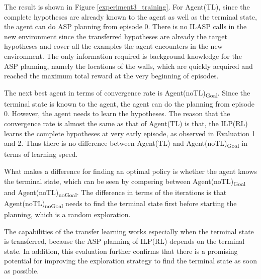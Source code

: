 The result is shown in Figure \ref{experiment3_training}.
For Agent(TL), since the complete hypotheses are already known to the agent as well as the terminal state, the agent can do ASP planning from episode 0. There is no ILASP calls in the new environment since the transferred hypotheses are already the target hypotheses and cover all the examples the agent encounters in the new environment.
The only information required is background knowledge for the ASP planning, namely the locations of the walls, which are quickly acquired and reached the maximum total reward at the very beginning of episodes.

The next best agent in terms of convergence rate is Agent(noTL)\textsubscript{Goal}. Since the terminal state is known to the agent, 
the agent can do the planning from episode 0. However, the agent needs to learn the hypotheses. The reason that the convergence rate is almost the same as that of Agent(TL) is that, the ILP(RL) learns the complete hypotheses at very early episode, as observed in Evaluation 1 and 2. 
Thus there is no difference between Agent(TL) and Agent(noTL)\textsubscript{Goal} in terms of learning speed. 

What makes a difference for finding an optimal policy is whether the agent knows the terminal state, which can be seen by compering between Agent(noTL)\textsubscript{Goal} and Agent(noTL)\textsubscript{noGoal}.
The difference in terms of the iterations is that Agent(noTL)\textsubscript{noGoal} needs to find the terminal state first before starting the planning, which is a random exploration.

The capabilities of the transfer learning works especially when the terminal state is transferred, because the ASP planning of ILP(RL) depends on the terminal state. 
In addition, this evaluation further confirms that there is a promising potential for improving the exploration strategy to find the terminal state as soon as possible.

